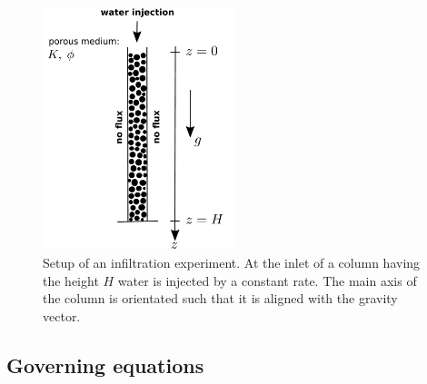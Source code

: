 \documentclass[smallextended]{svjour3}       %
\begin{document}
\begin{figure}
\begin{center}
\includegraphics[width=0.5\textwidth]{column.pdf}
\end{center}
\caption{\label{fig:column} Setup of an infiltration experiment. At the inlet of a column having the height $H$ water is injected by a constant rate. The main axis
of the column is orientated such that it is aligned with the gravity vector.}
\end{figure}

\subsection{Governing equations}
\end{document}
